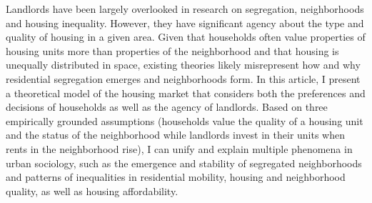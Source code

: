 Landlords have been largely overlooked in research on segregation, neighborhoods and housing inequality. However, they have significant agency about the type and quality of housing in a given area. Given that households often value properties of housing units more than properties of the neighborhood and that housing is unequally distributed in space, existing theories likely misrepresent how and why residential segregation emerges and neighborhoods form. In this article, I present a theoretical model of the housing market that considers both the preferences and decisions of households as well as the agency of landlords. Based on three empirically grounded assumptions (households value the quality of a housing unit and the status of the neighborhood while landlords invest in their units when rents in the neighborhood rise), I can unify and explain multiple phenomena in urban sociology, such as the emergence and stability of segregated neighborhoods and patterns of inequalities in residential mobility, housing and neighborhood quality, as well as housing affordability.